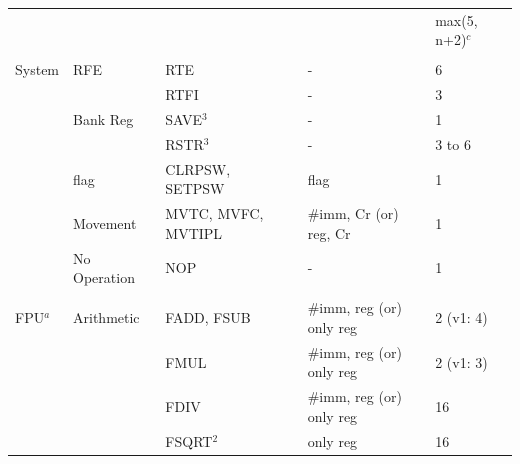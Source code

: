 \begin{table}
\begin{subtable}{\linewidth}
\begin{center}
\begin{tabular}{lllll}
                   &                    &                                        &                                    & max(5, n+2)$^c$          \\
                   &                    &                                        &                                    &                          \\
System             & RFE                & RTE                                    & -                                  & 6                        \\
                   &                    & RTFI                                   & -                                  & 3                        \\
                   & Bank Reg           & SAVE$^3$                               & -                                  & 1                        \\
                   &                    & RSTR$^3$                               & -                                  & 3 to 6                   \\
                   & flag               & CLRPSW, SETPSW                         & flag                               & 1                        \\
                   & Movement           & MVTC, MVFC, MVTIPL                     & \#imm, Cr (or) reg, Cr             & 1                        \\
                   & No Operation       & NOP                                    & -                                  & 1                        \\
                   &                    &                                        &                                    &                          \\
FPU$^a$            & Arithmetic         & FADD, FSUB                             & \#imm, reg (or) only reg           & 2 (v1: 4)                \\
                   &                    & FMUL                                   & \#imm, reg (or) only reg           & 2 (v1: 3)                \\
                   &                    & FDIV                                   & \#imm, reg (or) only reg           & 16                       \\
                   &                    & FSQRT$^2$                              & only reg                           & 16                       \\

\end{tabular}
\end{center}
\end{subtable}
\end{table}
